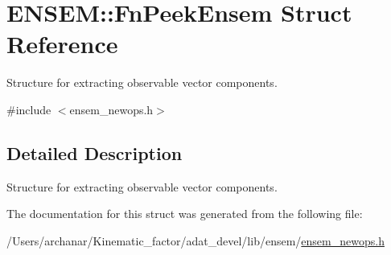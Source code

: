 \hypertarget{structENSEM_1_1FnPeekEnsem}{}\section{E\+N\+S\+EM\+:\+:Fn\+Peek\+Ensem Struct Reference}
\label{structENSEM_1_1FnPeekEnsem}


Structure for extracting observable vector components.  




{\ttfamily \#include $<$ensem\+\_\+newops.\+h$>$}



\subsection{Detailed Description}
Structure for extracting observable vector components. 

The documentation for this struct was generated from the following file\+:\begin{DoxyCompactItemize}
\item 
/\+Users/archanar/\+Kinematic\+\_\+factor/adat\+\_\+devel/lib/ensem/\mbox{\hyperlink{lib_2ensem_2ensem__newops_8h}{ensem\+\_\+newops.\+h}}\end{DoxyCompactItemize}
